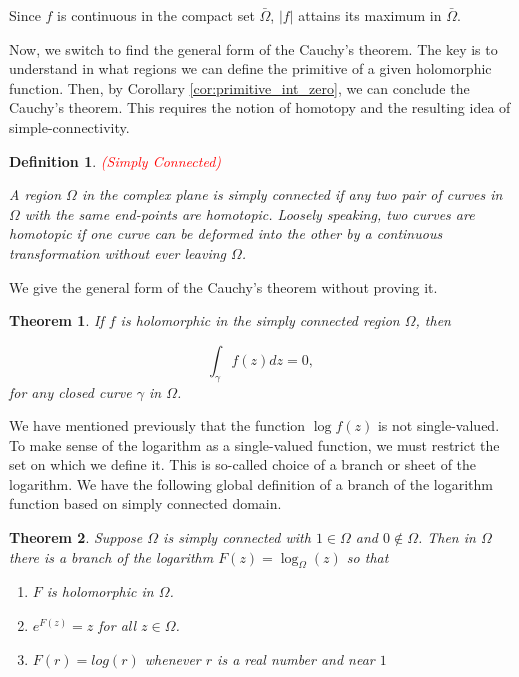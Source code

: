 \documentclass{article}
\newtheorem{definition}{Definition}
\newtheorem{theorem}{Theorem}
\begin{document}
Since $f$ is continuous in the compact set $\bar{\Omega}$, $|f|$ attains its maximum in $\bar{\Omega}$.

Now, we switch to find the general form of the Cauchy's theorem. The key is to understand in what regions we can define the primitive of a given holomorphic function. Then, by Corollary \ref{cor:primitive_int_zero}, we can conclude the Cauchy's theorem. This requires the notion of homotopy and the resulting idea of simple-connectivity. 

\begin{definition} \textcolor{red}{(Simply Connected)}

A region $\Omega$ in the complex plane is simply connected if any two pair of curves in $\Omega$ with the same end-points are homotopic. Loosely speaking, two curves are homotopic if one curve can be deformed into the other by a continuous transformation without ever leaving $\Omega$.
\end{definition}

We give the general form of the Cauchy's theorem without proving it. 

\begin{theorem}
If $f$ is holomorphic in the simply connected region $\Omega$, then 

\begin{equation*}
\int_\gamma f(z)dz=0,
\end{equation*}
for any closed curve $\gamma$ in $\Omega$.
\end{theorem}

We have mentioned previously that the function $\log f(z)$ is not single-valued. To make sense of the logarithm as a single-valued function, we must restrict the set on which we define it. This is so-called choice of a branch or sheet of the logarithm. We have the following global definition of a branch of the logarithm function based on simply connected domain. 

\begin{theorem}
Suppose $\Omega$ is simply connected with $1\in\Omega$ and $0\notin\Omega$. Then in $\Omega$ there is a branch of the logarithm $F(z)=\log_\Omega(z)$ so that 

\begin{enumerate}
\item
$F$ is holomorphic in $\Omega$.

\item
$e^{F(z)}=z$ for all $z\in\Omega$.

\item
$F(r)=log(r)$ whenever $r$ is a real number and near $1$
\end{enumerate}
\end{theorem}
\end{document}
